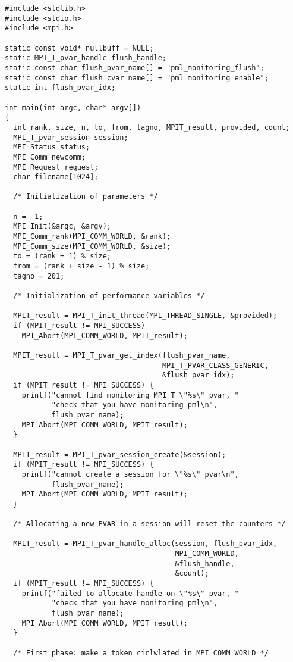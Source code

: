 \begin{verbatim}
#include <stdlib.h>
#include <stdio.h>
#include <mpi.h>

static const void* nullbuff = NULL;
static MPI_T_pvar_handle flush_handle;
static const char flush_pvar_name[] = "pml_monitoring_flush";
static const char flush_cvar_name[] = "pml_monitoring_enable";
static int flush_pvar_idx;

int main(int argc, char* argv[])
{
  int rank, size, n, to, from, tagno, MPIT_result, provided, count;
  MPI_T_pvar_session session;
  MPI_Status status;
  MPI_Comm newcomm;
  MPI_Request request;
  char filename[1024];

  /* Initialization of parameters */

  n = -1;
  MPI_Init(&argc, &argv);
  MPI_Comm_rank(MPI_COMM_WORLD, &rank);
  MPI_Comm_size(MPI_COMM_WORLD, &size);
  to = (rank + 1) % size;
  from = (rank + size - 1) % size;
  tagno = 201;

  /* Initialization of performance variables */

  MPIT_result = MPI_T_init_thread(MPI_THREAD_SINGLE, &provided);
  if (MPIT_result != MPI_SUCCESS)
    MPI_Abort(MPI_COMM_WORLD, MPIT_result);

  MPIT_result = MPI_T_pvar_get_index(flush_pvar_name, 
                                     MPI_T_PVAR_CLASS_GENERIC, 
                                     &flush_pvar_idx);
  if (MPIT_result != MPI_SUCCESS) {
    printf("cannot find monitoring MPI_T \"%s\" pvar, "
           "check that you have monitoring pml\n",
           flush_pvar_name);
    MPI_Abort(MPI_COMM_WORLD, MPIT_result);
  }

  MPIT_result = MPI_T_pvar_session_create(&session);
  if (MPIT_result != MPI_SUCCESS) {
    printf("cannot create a session for \"%s\" pvar\n", 
           flush_pvar_name);
    MPI_Abort(MPI_COMM_WORLD, MPIT_result);
  }

  /* Allocating a new PVAR in a session will reset the counters */

  MPIT_result = MPI_T_pvar_handle_alloc(session, flush_pvar_idx,
                                        MPI_COMM_WORLD, 
                                        &flush_handle, 
                                        &count);
  if (MPIT_result != MPI_SUCCESS) {
    printf("failed to allocate handle on \"%s\" pvar, "
           "check that you have monitoring pml\n",
           flush_pvar_name);
    MPI_Abort(MPI_COMM_WORLD, MPIT_result);
  }

  /* First phase: make a token cirlwlated in MPI_COMM_WORLD */


\end{verbatim}
